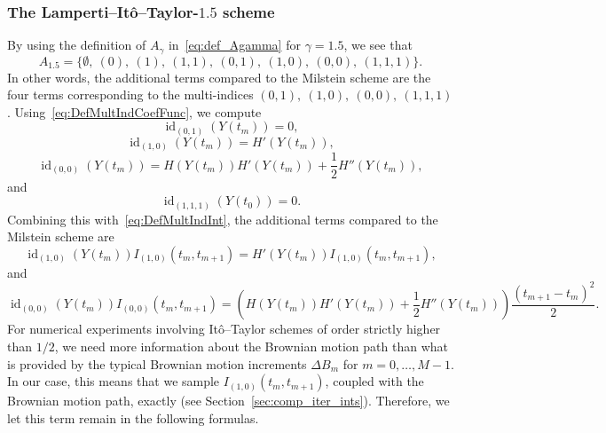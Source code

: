 \documentclass[11pt]{amsart}
\newcommand{\id}{\operatorname{id}}
\begin{document}
{\subsubsection{The Lamperti--Itô--Taylor-$1.5$ scheme}
By using the definition of $A_{\gamma}$ in~\eqref{eq:def_Agamma} for $\gamma=1.5$, we see that
\begin{equation*}
A_{1.5} = \{ \emptyset,\ (0),\ (1),\ (1,1),\ (0,1),\ (1,0),\ (0,0),\ (1,1,1) \}.
\end{equation*}
In other words, the additional terms compared to the Milstein scheme are the four terms corresponding to the multi-indices $(0,1),\ (1,0),\ (0,0),\ (1,1,1)$. Using~\eqref{eq:DefMultIndCoefFunc}, we compute
\begin{equation*}
\id_{(0,1)}(Y(t_{m})) = 0,
\end{equation*}
\begin{equation*}
\id_{(1,0)}(Y(t_{m})) = H'(Y(t_{m})),
\end{equation*}
\begin{equation*}
\id_{(0,0)}(Y(t_{m})) = H(Y(t_{m})) H'(Y(t_{m})) + \frac{1}{2} H''(Y(t_{m})),
\end{equation*}
and
\begin{equation*}
\id_{(1,1,1)}(Y(t_{0})) = 0.
\end{equation*}
Combining this with~\eqref{eq:DefMultIndInt}, the additional terms compared to the Milstein scheme are
\begin{equation*}
\id_{(1,0)}(Y(t_{m})) I_{(1,0)}(t_{m},t_{m+1}) =  H'(Y(t_{m})) I_{(1,0)}(t_{m},t_{m+1}),
\end{equation*}
and
\begin{equation*}
\id_{(0,0)}(Y(t_{m})) I_{(0,0)}(t_{m},t_{m+1}) = \left( H(Y(t_{m})) H'(Y(t_{m})) + \frac{1}{2} H''(Y(t_{m})) \right) \frac{(t_{m+1}-t_{m})^{2}}{2}.
\end{equation*}
For numerical experiments involving Itô--Taylor schemes of order strictly higher than $1/2$, we need more information about the Brownian motion path than what is provided by the typical Brownian motion increments $\Delta B_{m}$ for $m=0,\ldots,M-1$. In our case, this means that we sample $I_{(1,0)}(t_{m},t_{m+1})$, coupled with the Brownian motion path, exactly (see Section~\ref{sec:comp_iter_ints}). Therefore, we let this term remain in the following formulas.

}
\end{document}
